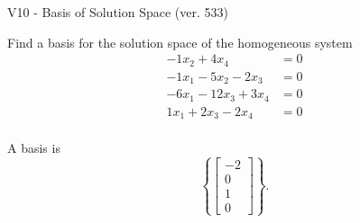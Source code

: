 \begin{exercise}
  \begin{exerciseTitle}V10 - Basis of Solution Space (ver. 533)\end{exerciseTitle}
  \begin{exerciseStatement}
    Find a basis for the solution space of the homogeneous system 
\begin{align*}
 -1 x_ 2 + 4 x_ 4 &= 0  \\ 
  -1 x_ 1 -5 x_ 2 -2 x_ 3 &= 0  \\ 
  -6 x_ 1 -12 x_ 3 + 3 x_ 4 &= 0  \\ 
  1 x_ 1 + 2 x_ 3 -2 x_ 4 &= 0  \\ 
 \end{align*}


 
  \end{exerciseStatement}

  \begin{exerciseAnswer}
   A basis is   
\[\left\{\left[\begin{array}{c}
-2 \\
0 \\
1 \\
0
\end{array}\right]\right\}.\]

  


  \end{exerciseAnswer}
\end{exercise}